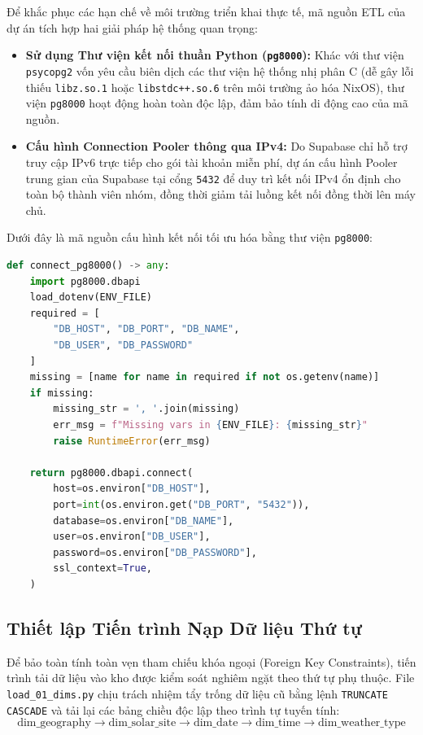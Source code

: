 \documentclass[12pt, a4paper]{report}
\begin{document}
Để khắc phục các hạn chế về môi trường triển khai thực tế, mã nguồn ETL của dự án tích hợp hai giải pháp hệ thống quan trọng:
\begin{itemize}
    \item \textbf{Sử dụng Thư viện kết nối thuần Python (\texttt{pg8000}):} Khác với thư viện \texttt{psycopg2} vốn yêu cầu biên dịch các thư viện hệ thống nhị phân C (dễ gây lỗi thiếu \texttt{libz.so.1} hoặc \texttt{libstdc++.so.6} trên môi trường ảo hóa NixOS), thư viện \texttt{pg8000} hoạt động hoàn toàn độc lập, đảm bảo tính di động cao của mã nguồn.
    \item \textbf{Cấu hình Connection Pooler thông qua IPv4:} Do Supabase chỉ hỗ trợ truy cập IPv6 trực tiếp cho gói tài khoản miễn phí, dự án cấu hình Pooler trung gian của Supabase tại cổng \texttt{5432} để duy trì kết nối IPv4 ổn định cho toàn bộ thành viên nhóm, đồng thời giảm tải luồng kết nối đồng thời lên máy chủ.
\end{itemize}

Dưới đây là mã nguồn cấu hình kết nối tối ưu hóa bằng thư viện \texttt{pg8000}:

\begin{lstlisting}[language=Python, caption={Mã nguồn thiết lập kết nối cơ sở dữ liệu qua Pooler bằng pg8000}, label={lst:pg8000_conn}]
def connect_pg8000() -> any:
    import pg8000.dbapi
    load_dotenv(ENV_FILE)
    required = [
        "DB_HOST", "DB_PORT", "DB_NAME", 
        "DB_USER", "DB_PASSWORD"
    ]
    missing = [name for name in required if not os.getenv(name)]
    if missing:
        missing_str = ', '.join(missing)
        err_msg = f"Missing vars in {ENV_FILE}: {missing_str}"
        raise RuntimeError(err_msg)

    return pg8000.dbapi.connect(
        host=os.environ["DB_HOST"],
        port=int(os.environ.get("DB_PORT", "5432")),
        database=os.environ["DB_NAME"],
        user=os.environ["DB_USER"],
        password=os.environ["DB_PASSWORD"],
        ssl_context=True,
    )
\end{lstlisting}

\subsection{Thiết lập Tiến trình Nạp Dữ liệu Thứ tự}
Để bảo toàn tính toàn vẹn tham chiếu khóa ngoại (Foreign Key Constraints), tiến trình tải dữ liệu vào kho được kiểm soát nghiêm ngặt theo thứ tự phụ thuộc. File \texttt{load\_01\_dims.py} chịu trách nhiệm tẩy trống dữ liệu cũ bằng lệnh \texttt{TRUNCATE CASCADE} và tải lại các bảng chiều độc lập theo trình tự tuyến tính:
\begin{equation*}
\text{dim\_geography} \longrightarrow \text{dim\_solar\_site} \longrightarrow \text{dim\_date} \longrightarrow \text{dim\_time} \longrightarrow \text{dim\_weather\_type}
\end{equation*}
\end{document}
